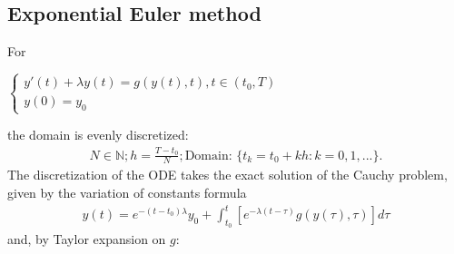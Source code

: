 \documentclass[letterpaper,10pt,english]{jupyterBook}
\begin{document}
\subsection{Exponential Euler method}
\label{\detokenize{cap4:exponential-euler-method}}
\sphinxAtStartPar
For

\sphinxAtStartPar
\(\begin{cases}
    y'(t) + \lambda y(t) = g(y(t), t), t \in (t_0, T) \\
    y(0) = y_0
\end{cases}\)

\sphinxAtStartPar
the domain is evenly discretized:
\begin{equation*}
\begin{split}
    N \in \mathbb{N}; h = \frac{T-t_0}{N}; \text{Domain: }\{t_k = t_0 + k h : k = 0, 1, ...\}.
\end{split}
\end{equation*}
\sphinxAtStartPar
The discretization of the ODE takes the exact solution of the Cauchy problem, given by the variation of constants formula
\begin{equation*}
\begin{split}
    y(t) = e^{-(t-t_0) \lambda}y_0 + \int_{t_0}^t [e^{-\lambda(t-\tau)} g(y(\tau), \tau)] d\tau
\end{split}
\end{equation*}
\sphinxAtStartPar
and, by Taylor expansion on \(g\):
\end{document}
